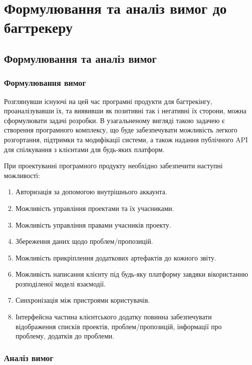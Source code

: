 \documentclass[../main.tex]{subfiles}
\begin{document}
\chapter{Формулювання та аналіз вимог до багтрекеру}

\section{Формулювання та аналіз вимог}

\subsection{Формулювання вимог}

Розглянувши існуючі на цей час програмні продукти для багтрекінгу, проаналізувавши їх, та виявивши як позитивні так і негативні їх сторони, можна сформулювати задачі розробки. В узагальненому вигляді такою задачею є створення програмного комплексу, що буде забезпечувати можливість легкого розгортання, підтримки та модифікації системи, а також надання публічного API для спілкування з клієнтами для будь-яких платформ.

При проектуванні програмного продукту необхідно забезпечити наступні можливості:
\begin{enumerate}
    \item Авторизація за допомогою внутрішнього аккаунта.
    \item Можливість управління проектами та їх учасниками.
    \item Можливість управління правами учасників проекту.
    \item Збереження даних щодо проблем/пропозицій.
    \item Можливість прикріплення додаткових артефактів до кожного звіту.
    \item Можливість написання клієнту під будь-яку платформу завдяки вікористанню розподіленої моделі взаємодії.
    \item Синхронізація між пристроями користувачів.
    \item Інтерфейсна частина клієнтського додатку повинна забезпечувати відображення списків проектів, проблем/пропозицій, інформації про проблему, додатків до проблеми.
\end{enumerate}

\subsection{Аналіз вимог}
\end{document}
